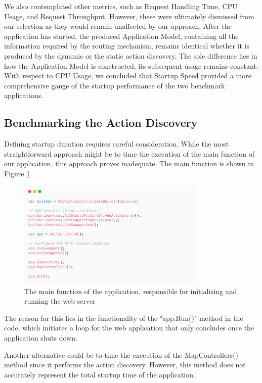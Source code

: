 We also contemplated other metrics, such as Request Handling Time, CPU Usage, and Request Throughput. However, these were ultimately dismissed from our selection as they would remain unaffected by our approach. After the application has started, the produced Application Model, containing all the information required by the routing mechanism, remains identical whether it is produced by the dynamic or the static action discovery. The sole difference lies in how the Application Model is constructed; its subsequent usage remains constant. With respect to CPU Usage, we concluded that Startup Speed provided a more comprehensive gauge of the startup performance of the two benchmark applications.

\subsection{Benchmarking the Action Discovery}

Defining startup duration requires careful consideration. While the most straightforward approach might be to time the execution of the main function of our application, this approach proves inadequate. The main function is shown in Figure \ref{fig:startup-method}.

\begin{figure}[H]
\centering
\includegraphics[width=0.8\textwidth]{graphics/startup-method.png}
\caption{The main function of the application, responsible for initializing and running the web server}
\label{fig:startup-method}
\end{figure}

The reason for this lies in the functionality of the "app.Run()" method in the code, which initiates a loop for the web application that only concludes once the application shuts down.

Another alternative could be to time the execution of the MapControllers() method since it performs the action discovery. However, this method does not accurately represent the total startup time of the application.

